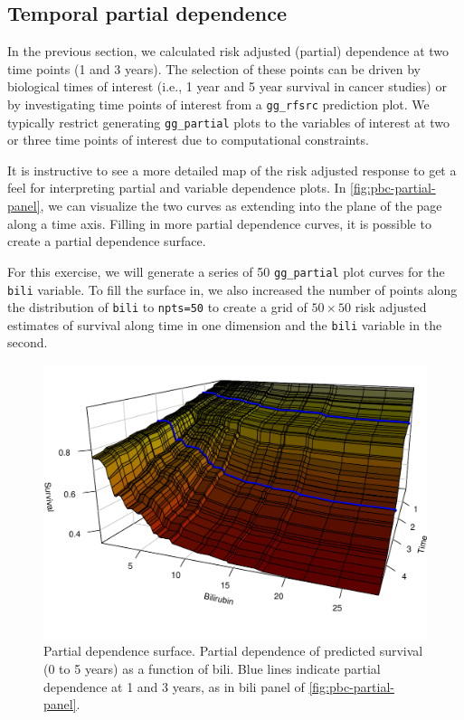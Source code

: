 \documentclass[article, nojss]{jss}
\begin{document}
\subsection{Temporal partial
dependence}\label{temporal-partial-dependence}

In the previous section, we calculated risk adjusted (partial)
dependence at two time points (1 and 3 years). The selection of these
points can be driven by biological times of interest (i.e., 1 year and 5
year survival in cancer studies) or by investigating time points of
interest from a \texttt{gg\_rfsrc} prediction plot. We typically
restrict generating \texttt{gg\_partial} plots to the variables of
interest at two or three time points of interest due to computational
constraints.

It is instructive to see a more detailed map of the risk adjusted
response to get a feel for interpreting partial and variable dependence
plots. In \autoref{fig:pbc-partial-panel}, we can visualize the two
curves as extending into the plane of the page along a time axis.
Filling in more partial dependence curves, it is possible to create a
partial dependence surface.

For this exercise, we will generate a series of 50 \texttt{gg\_partial}
plot curves for the \texttt{bili} variable. To fill the surface in, we
also increased the number of points along the distribution of
\texttt{bili} to \texttt{npts=50} to create a grid of \(50 \times 50\)
risk adjusted estimates of survival along time in one dimension and the
\texttt{bili} variable in the second.

\begin{Schunk}
\begin{figure}[!htb]

{\centering \includegraphics{rfs-timeSurface3d-1}

}

\caption{Partial dependence surface. Partial dependence of predicted survival (0 to 5 years) as a function of bili. Blue lines indicate partial dependence at 1 and 3 years, as in bili panel of \autoref{fig:pbc-partial-panel}.}\label{fig:timeSurface3d}
\end{figure}
\end{Schunk}
\end{document}
